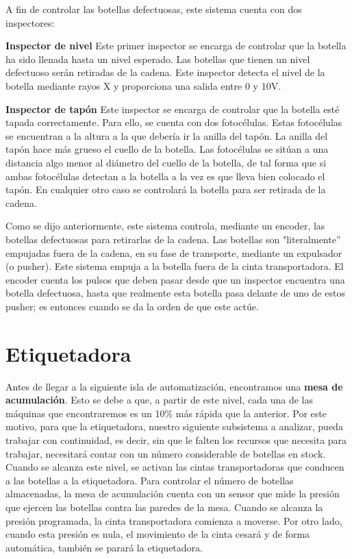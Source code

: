 \documentclass[11pt,a4paper,spanish,twoside]{report}
\begin{document}
A fin de controlar las botellas defectuosas, este sistema cuenta con dos 
inspectores:
\begin{description}
\item \textbf{Inspector de nivel}
Este primer inspector se encarga de controlar que la botella ha sido llenada 
hasta un nivel esperado. Las botellas que tienen un nivel defectuoso serán 
retiradas de la cadena. Este inspector detecta el nivel de la botella mediante 
rayos X y proporciona una salida entre 0 y 10V.

\item \textbf{Inspector de tapón}
Este inspector se encarga de controlar que la botella esté tapada 
correctamente. Para ello, se cuenta con dos fotocélulas. Estas fotocélulas se 
encuentran a la altura a la que debería ir la anilla del tapón. La anilla del 
tapón hace más grueso el cuello de la botella. Las fotocélulas se sitúan a una 
distancia algo menor al diámetro del cuello de la botella, de tal forma que si
ambas fotocélulas detectan a la botella a la vez es que lleva bien colocado el 
tapón. En cualquier otro caso se controlará la botella para ser retirada  de 
la cadena.
\end{description}

Como se dijo anteriormente, este sistema controla, mediante un encoder, las 
botellas defectuosas para retirarlas de la cadena. Las botellas son 
"literalmente'' empujadas fuera de la cadena, en su fase de transporte, 
mediante un expulsador (o pusher). Este sistema empuja a la botella fuera de 
la cinta transportadora. El encoder cuenta los pulsos que deben pasar desde 
que un inspector encuentra una botella defectuosa, hasta que realmente esta 
botella pasa delante de uno de estos pusher; es entonces cuando se da la orden 
de que este actúe.

\section{Etiquetadora}
Antes de llegar a la siguiente isla de automatización, encontramos una 
\textbf{mesa de acumulación}. Esto se debe a que, a partir de este nivel, cada
una de las máquinas que encontraremos es un 10\% más rápida que la anterior.
Por este motivo, para que la etiquetadora, nuestro siguiente subsistema a 
analizar, pueda trabajar con continuidad, es decir, sin que le falten los 
recursos que necesita para trabajar, necesitará contar con un número 
considerable de botellas en stock. Cuando se alcanza este nivel, se activan 
las cintas transportadoras que conducen a las botellas a la etiquetadora.
Para controlar el número de botellas almacenadas, la mesa de acumulación 
cuenta con un sensor que mide la presión que ejercen las botellas contra las
paredes de la mesa. Cuando se alcanza la presión programada, la cinta 
transportadora comienza a moverse. Por otro lado, cuando esta presión es nula,
el movimiento de la cinta cesará y de forma automática, también se parará
la etiquetadora.
\end{document}
